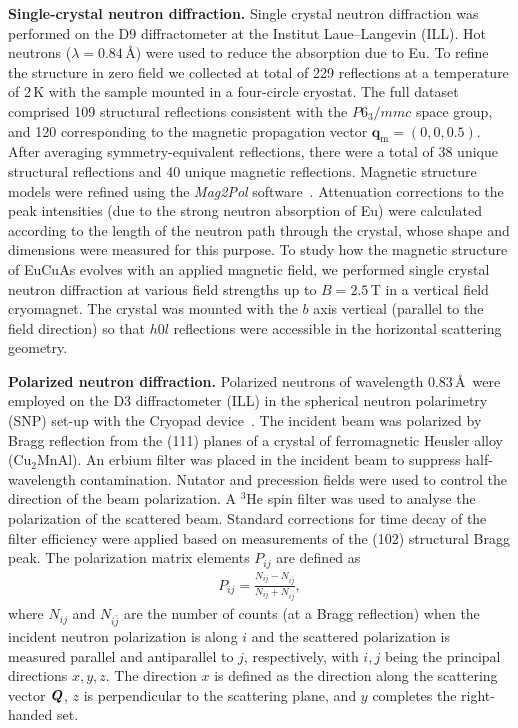 \documentclass[aps,prl,amsmath,amssymb,amstext,citeautoscript,punctuation,nofootinbib,superscriptaddress,twocolumn]{revtex4-1}
\newcommand{\eca}{EuCuAs}
\begin{document}
\textbf{Single-crystal neutron diffraction.} Single crystal neutron diffraction was performed on the D9 diffractometer at the Institut Laue--Langevin (ILL). Hot neutrons ($\lambda = 0.84$\,{\AA}) were used to reduce the absorption due to Eu. To refine the structure in zero field we collected at total of 229 reflections at a temperature of 2\,K with the sample mounted in a four-circle cryostat. The full dataset comprised 109 structural reflections consistent with the $P6_3/mmc$ space group, and 120 corresponding to the magnetic propagation vector $\textbf{q}_\textrm{m} = (0,0,0.5)$. After averaging symmetry-equivalent reflections, there were a total of 38 unique structural reflections and 40 unique magnetic reflections. Magnetic structure models were refined using the {\it Mag2Pol} software~\cite{QureshiMag2Pol}. Attenuation corrections to the peak intensities (due to the strong neutron absorption of Eu) were calculated according to the length of the neutron path through the crystal, whose shape and dimensions were measured for this purpose. To study how the magnetic structure of \eca{} evolves with an applied magnetic field, we performed single crystal neutron diffraction at various field strengths up to $B = 2.5$\,T in a vertical field cryomagnet. The crystal was mounted with the $b$ axis vertical (parallel to the field direction) so that $h0l$ reflections were accessible in the horizontal scattering geometry.

\textbf{Polarized neutron diffraction.}
Polarized neutrons of wavelength 0.83\,\AA\ were employed on the D3 diffractometer (ILL) in the spherical neutron polarimetry (SNP) set-up with the Cryopad device~\cite{Lelievre2005}. The incident beam was polarized by Bragg reflection from  the (111) planes of a crystal of ferromagnetic Heusler alloy (Cu$_2$MnAl). An erbium filter was placed in the incident beam to suppress half-wavelength contamination. Nutator and precession fields were used to control the direction of the beam polarization.  A $^{3}$He spin filter was used to analyse the polarization of the scattered beam.  Standard corrections for time decay of the filter efficiency were applied based on measurements of the (102) structural Bragg peak. The polarization matrix elements $P_{ij}$ are defined as
\begin{align}
    P_{ij} = \frac{N_{ij} - N_{i\bar{j}}}{N_{ij} + N_{i\bar{j}}},
    \nonumber
\end{align}
where $N_{ij}$ and $N_{i\bar{j}}$ are the number of counts (at a Bragg reflection) when the incident neutron polarization is along $i$ and the scattered polarization is measured parallel and antiparallel to $j$, respectively, with $i,j$ being the principal directions $x, y, z$. The direction $x$ is defined as the direction along the scattering vector $\textbf{\textit{Q}}$, $z$ is perpendicular to the scattering plane, and $y$ completes the right-handed set. 
\end{document}
